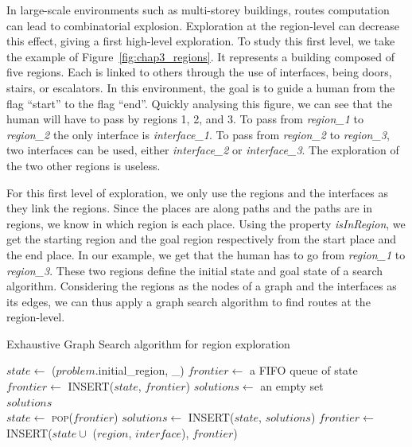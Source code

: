 In large-scale environments such as multi-storey buildings, routes computation can lead to combinatorial explosion. Exploration at the region-level can decrease this effect, giving a first high-level exploration. To study this first level, we take the example of Figure~\ref{fig:chap3_regions}. It represents a building composed of five regions. Each is linked to others through the use of interfaces, being doors, stairs, or escalators. In this environment, the goal is to guide a human from the flag ``start'' to the flag ``end''. Quickly analysing this figure, we can see that the human will have to pass by regions 1, 2, and 3. To pass from \textit{region\_1} to \textit{region\_2} the only interface is \textit{interface\_1}. To pass from \textit{region\_2} to \textit{region\_3}, two interfaces can be used, either \textit{interface\_2} or \textit{interface\_3}. The exploration of the two other regions is useless.

For this first level of exploration, we only use the regions and the interfaces as they link the regions. Since the places are along paths and the paths are in regions, we know in which region is each place. Using the property \textit{isInRegion}, we get the starting region and the goal region respectively from the start place and the end place. In our example, we get that the human has to go from \textit{region\_1} to \textit{region\_3}. These two regions define the initial state and goal state of a search algorithm. Considering the regions as the nodes of a graph and the interfaces as its edges, we can thus apply a graph search algorithm to find routes at the region-level.

\begin{algorithm}[!htb]
\caption{Exhaustive Graph Search algorithm for region exploration}
\label{alg:chap3_region_search}
\begin{algorithmic}[1]
	\State $state \leftarrow$ ($problem$.initial\_region, \_) 
    \State $frontier\leftarrow$ a FIFO queue of state
    \State $frontier\leftarrow$ \textsc{INSERT}($state$, $frontier$)
    \State $solutions\leftarrow$ an empty set
    \\
    \Loop
        	\State \Return $solutions$
        \EndIf
        \\
        \State $state\leftarrow$ \textsc{pop}($frontier$)
        	\State $solutions\leftarrow$ \textsc{INSERT}($state$, $solutions$)
        \Else
        				\State $frontier\leftarrow$ \textsc{INSERT}($state \cup$ ($region$, $interface$), $frontier$)
        			\EndIf
        		\EndFor
        	\EndFor
        \EndIf
    \EndLoop
\EndFunction
\end{algorithmic}
\end{algorithm}

